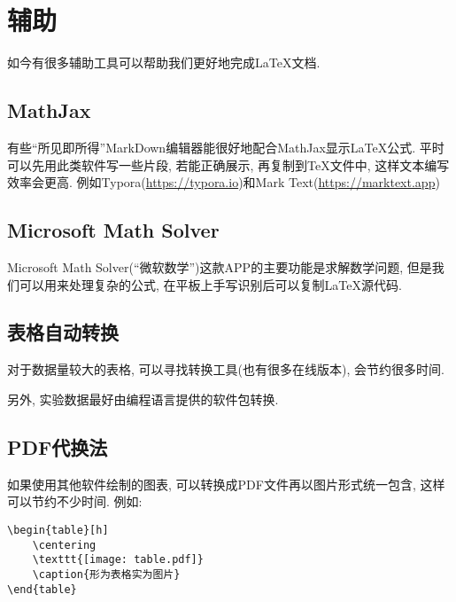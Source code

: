 \chapter{辅助}

如今有很多辅助工具可以帮助我们更好地完成\LaTeX{}文档.

\section{MathJax}

有些``所见即所得''MarkDown编辑器能很好地配合MathJax显示\LaTeX{}公式.
平时可以先用此类软件写一些片段, 若能正确展示, 再复制到\TeX{}文件中, 这样文本编写效率会更高.
例如Typora(\url{https://typora.io})和Mark Text(\url{https://marktext.app})

\section{Microsoft Math Solver}

Microsoft Math Solver(``微软数学'')这款APP的主要功能是求解数学问题, 但是我们可以用来处理复杂的公式, 在平板上手写识别后可以复制\LaTeX{}源代码.

\section{表格自动转换}

对于数据量较大的表格, 可以寻找转换工具(也有很多在线版本), 会节约很多时间.

另外, 实验数据最好由编程语言提供的软件包转换.

\section{PDF代换法}

如果使用其他软件绘制的图表, 可以转换成PDF文件再以图片形式统一包含, 这样可以节约不少时间.
例如:
\begin{Verbatim}
\begin{table}[h]
    \centering
    \texttt{[image: table.pdf]}
    \caption{形为表格实为图片}
\end{table}
\end{Verbatim}
